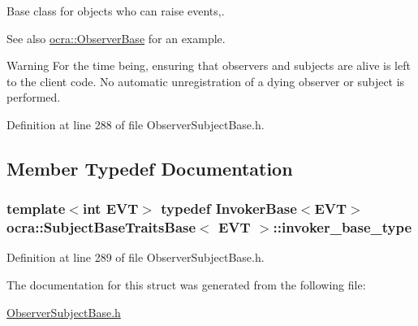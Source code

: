 Base class for objects who can raise events,. 

\begin{DoxySeeAlso}{See also}
\hyperlink{classocra_1_1ObserverBase}{ocra\+::\+Observer\+Base} for an example.
\end{DoxySeeAlso}
\begin{DoxyWarning}{Warning}
For the time being, ensuring that observers and subjects are alive is left to the client code. No automatic unregistration of a dying observer or subject is performed. 
\end{DoxyWarning}


Definition at line 288 of file Observer\+Subject\+Base.\+h.



\subsection{Member Typedef Documentation}
\subsubsection[{\texorpdfstring{invoker\+\_\+base\+\_\+type}{invoker_base_type}}]{\setlength{\rightskip}{0pt plus 5cm}template$<$int E\+VT$>$ typedef {\bf Invoker\+Base}$<$E\+VT$>$ {\bf ocra\+::\+Subject\+Base\+Traits\+Base}$<$ E\+VT $>$\+::{\bf invoker\+\_\+base\+\_\+type}}\hypertarget{structocra_1_1SubjectBaseTraitsBase_a439671662c8f8f3e80e6675f008dec3f}{}\label{structocra_1_1SubjectBaseTraitsBase_a439671662c8f8f3e80e6675f008dec3f}


Definition at line 289 of file Observer\+Subject\+Base.\+h.



The documentation for this struct was generated from the following file\+:\begin{DoxyCompactItemize}
\item 
\hyperlink{ObserverSubjectBase_8h}{Observer\+Subject\+Base.\+h}\end{DoxyCompactItemize}

